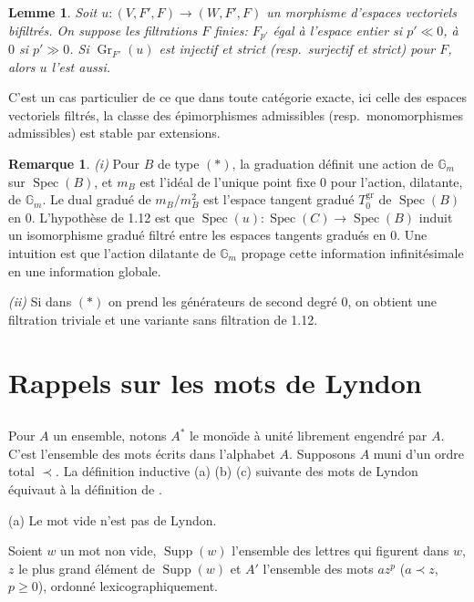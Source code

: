 \documentclass[11pt,a4paper]{article}
\theoremstyle{plain}
\newtheorem{lemma}[theorem]{Lemme}
\theoremstyle{definition}
\newtheorem{remark}[theorem]{Remarque}
\DeclareMathOperator{\Spec}{Spec}
\DeclareMathOperator{\Supp}{Supp}
\newcommand{\Gm}{\mathbb{G}_m}
\newcommand{\Gr}{\operatorname{Gr}}
\begin{document}
\begin{lemma}
\label{lem:1.13}
Soit $u: (V,F',F) \to (W,F',F)$ un morphisme d'espaces vectoriels bifiltr\'es. On suppose les filtrations $F$ finies: $F_{p'}$ \'egal \`a l'espace entier si $p' \ll 0$, \`a $0$ si $p' \gg 0$. Si $\Gr_{F'}(u)$ est injectif et strict (resp.~surjectif et strict) pour $F$, alors $u$ l'est aussi.
\end{lemma}

C'est un cas particulier de ce que dans toute cat\'egorie exacte, ici celle des espaces vectoriels filtr\'es, la classe des \'epimorphismes admissibles (resp.~monomorphismes admissibles) est stable par extensions.

\begin{remark}
\label{rmk:1.14}
\emph{(i)} Pour $B$ de type $(\ast)$, la graduation d\'efinit une action de $\Gm$ sur $\Spec(B)$, et $m_B$ est l'id\'eal de l'unique point fixe $0$ pour l'action, dilatante, de $\Gm$. Le dual gradu\'e de $m_B/m_B^2$ est l'espace tangent gradu\'e $T^{\mathrm{gr}}_0$ de $\Spec(B)$ en $0$. L'hypoth\`ese de 1.12 est que $\Spec(u): \Spec(C) \to \Spec(B)$ induit un isomorphisme gradu\'e filtr\'e entre les espaces tangents gradu\'es en $0$. Une intuition est que l'action dilatante de $\Gm$ propage cette information infinit\'esimale en une information globale.

\emph{(ii)} Si dans $(\ast)$ on prend les g\'en\'erateurs de second degr\'e $0$, on obtient une filtration triviale et une variante sans filtration de 1.12.
\end{remark}

\section{Rappels sur les mots de Lyndon}
\label{sec:2}

\subsection{}
Pour $A$ un ensemble, notons $A^{\ast}$ le mono\"{\i}de \`a unit\'e librement engendr\'e par $A$. C'est l'ensemble des mots \'ecrits dans l'alphabet $A$. Supposons $A$ muni d'un ordre total $\prec$. La d\'efinition inductive (a) (b) (c) suivante des mots de Lyndon \'equivaut \`a la d\'efinition de \cite{3}.

(a) Le mot vide n'est pas de Lyndon.

Soient $w$ un mot non vide, $\Supp(w)$ l'ensemble des lettres qui figurent dans $w$, $z$ le plus grand \'el\'ement de $\Supp(w)$ et $A'$ l'ensemble des mots $az^p$ ($a \prec z$, $p \geq 0$), ordonn\'e lexicographiquement.
\end{document}
